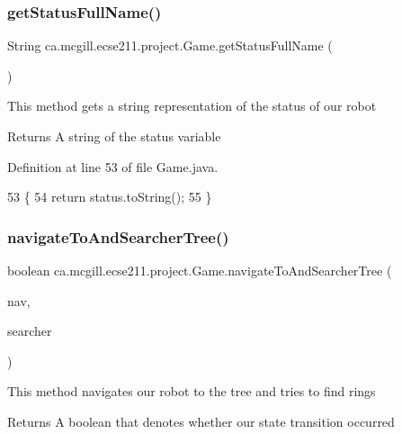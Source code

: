 \subsubsection{\texorpdfstring{get\+Status\+Full\+Name()}{getStatusFullName()}}
{\footnotesize\ttfamily String ca.\+mcgill.\+ecse211.\+project.\+Game.\+get\+Status\+Full\+Name (\begin{DoxyParamCaption}{ }\end{DoxyParamCaption})}

This method gets a string representation of the status of our robot

\begin{DoxyReturn}{Returns}
A string of the status variable 
\end{DoxyReturn}


Definition at line 53 of file Game.\+java.


\begin{DoxyCode}
53                                     \{
54     \textcolor{keywordflow}{return} status.toString();
55   \}
\end{DoxyCode}
\mbox{\label{enumca_1_1mcgill_1_1ecse211_1_1project_1_1_game_a623ef585f41a45d778590392314ea352}} 
\subsubsection{\texorpdfstring{navigate\+To\+And\+Searcher\+Tree()}{navigateToAndSearcherTree()}}
{\footnotesize\ttfamily boolean ca.\+mcgill.\+ecse211.\+project.\+Game.\+navigate\+To\+And\+Searcher\+Tree (\begin{DoxyParamCaption}\item[{\hyperlink{classca_1_1mcgill_1_1ecse211_1_1project_1_1_navigation}{Navigation}}]{nav,  }\item[{\hyperlink{classca_1_1mcgill_1_1ecse211_1_1project_1_1_ring_searcher}{Ring\+Searcher}}]{searcher }\end{DoxyParamCaption})}

This method navigates our robot to the tree and tries to find rings

\begin{DoxyReturn}{Returns}
A boolean that denotes whether our state transition occurred 
\end{DoxyReturn}


